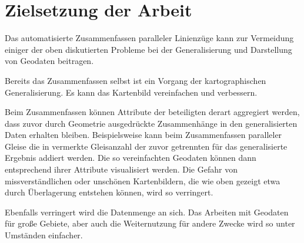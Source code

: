\documentclass[../main/thesis.tex]{subfiles}
\begin{document}







\section{Zielsetzung der Arbeit}


Das automatisierte Zusammenfassen paralleler Linienzüge kann zur Vermeidung einiger der oben diskutierten Probleme bei der Generalisierung und Darstellung von Geodaten beitragen.

Bereits das Zusammenfassen selbst ist ein Vorgang der kartographischen Generalisierung. Es kann das Kartenbild vereinfachen und verbessern.

Beim Zusammenfassen können Attribute der beteiligten  derart aggregiert werden, dass zuvor durch Geometrie ausgedrückte Zusammenhänge in den generalisierten Daten erhalten bleiben. Beispielsweise kann beim Zusammenfassen paralleler Gleise die in  vermerkte Gleisanzahl der zuvor getrennten  für das generalisierte Ergebnis addiert werden. Die so vereinfachten Geodaten können dann entsprechend ihrer Attribute visualisiert werden. Die Gefahr von missverständlichen oder unschönen Kartenbildern, die wie oben gezeigt etwa durch Überlagerung entstehen können, wird so verringert.

Ebenfalls verringert wird die Datenmenge an sich. Das Arbeiten mit Geodaten für große Gebiete, aber auch die Weiternutzung für andere Zwecke wird so unter Umständen einfacher.
\end{document}
